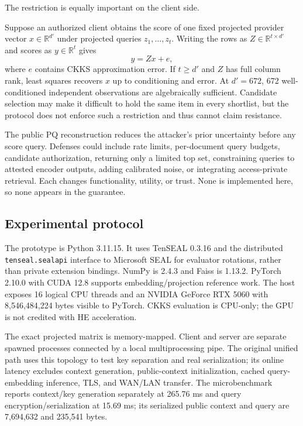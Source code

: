 \documentclass[pdflatex,sn-basic,Numbered]{sn-jnl}
\newcommand{\R}{\mathbb{R}}
\theoremstyle{plain}
\begin{document}
The restriction is equally important on the client side.\label{subsec:score-oracle}

Suppose an authorized client obtains the score of one fixed projected provider vector $x\in\R^{d'}$ under projected queries $z_1,\ldots,z_t$. Writing the rows as $Z\in\R^{t\times d'}$ and scores as $y\in\R^t$ gives
\begin{equation}
  y=Zx+e,
  \label{eq:oracle-system}
\end{equation}
where $e$ contains CKKS approximation error. If $t\geq d'$ and $Z$ has full column rank, least squares recovers $x$ up to conditioning and error. At $d'=672$, 672 well-conditioned independent observations are algebraically sufficient. Candidate selection may make it difficult to hold the same item in every shortlist, but the protocol does not enforce such a restriction and thus cannot claim resistance.

The public PQ reconstruction reduces the attacker's prior uncertainty before any score query. Defenses could include rate limits, per-document query budgets, candidate authorization, returning only a limited top set, constraining queries to attested encoder outputs, adding calibrated noise, or integrating access-private retrieval. Each changes functionality, utility, or trust. None is implemented here, so none appears in the guarantee.

\subsection{Experimental protocol}\label{subsec:implementation}

The prototype is Python 3.11.15. It uses TenSEAL 0.3.16 and the distributed \texttt{tenseal.sealapi} interface to Microsoft SEAL for evaluator rotations, rather than private extension bindings. NumPy is 2.4.3 and Faiss is 1.13.2. PyTorch 2.10.0 with CUDA 12.8 supports embedding/projection reference work. The host exposes 16 logical CPU threads and an NVIDIA GeForce RTX 5060 with 8,546,484,224 bytes visible to PyTorch. CKKS evaluation is CPU-only; the GPU is not credited with HE acceleration.

The exact projected matrix is memory-mapped. Client and server are separate spawned processes connected by a local multiprocessing pipe. The original unified path uses this topology to test key separation and real serialization; its online latency excludes context generation, public-context initialization, cached query-embedding inference, TLS, and WAN/LAN transfer. The microbenchmark reports context/key generation separately at 265.76 ms and query encryption/serialization at 15.69 ms; its serialized public context and query are 7,694,632 and 235,541 bytes.
\end{document}
